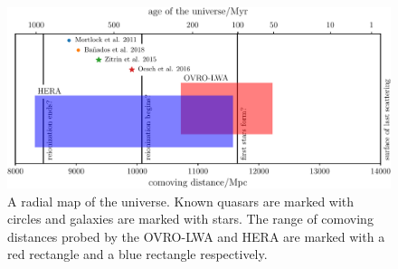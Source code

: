\begin{bibunit}
\begin{figure}[t]
    \centering
    \includegraphics[width=\textwidth]{figures/chapter1/history-of-the-universe/history-of-the-universe}
    \caption{
        A radial map of the universe. Known quasars are marked with circles and galaxies are marked
        with stars. The range of comoving distances probed by the OVRO-LWA and HERA are marked with a red
        rectangle and a blue rectangle respectively.
    }
    \label{fig:history-of-the-universe}
\end{figure}











\end{bibunit}

